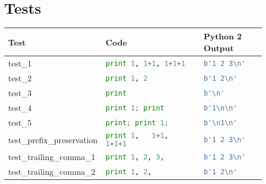 \section{Tests}
\begin{table*}[ht]
    \centering
    \begin{tabular}{@{}l|ll@{}}
    \toprule
    Test                                  & Code                                                  & Python 2 Output                        \\ \midrule
    test\_1                               & \lstinline[language=Python, style=pythonstyle]|print 1, 1+1, 1+1+1                                  | & \lstinline[language=Python, style=pythonstyle]|b'1 2 3\n'             | \\
    test\_2                               & \lstinline[language=Python, style=pythonstyle]|print 1, 2                                           | & \lstinline[language=Python, style=pythonstyle]|b'1 2\n'               | \\
    test\_3                               & \lstinline[language=Python, style=pythonstyle]|print                                                | & \lstinline[language=Python, style=pythonstyle]|b'\n'                  | \\
    test\_4                               & \lstinline[language=Python, style=pythonstyle]|print 1; print                                       | & \lstinline[language=Python, style=pythonstyle]|b'1\n\n'| \\
    test\_5                               & \lstinline[language=Python, style=pythonstyle]|print; print 1;                                      | & \lstinline[language=Python, style=pythonstyle]|b'\n1\n'| \\
    test\_prefix\_preservation            & \lstinline[language=Python, style=pythonstyle]|print 1,   1+1,   1+1+1                              | & \lstinline[language=Python, style=pythonstyle]|b'1 2 3\n'             | \\
    test\_trailing\_comma\_1              & \lstinline[language=Python, style=pythonstyle]|print 1, 2, 3,                                       | & \lstinline[language=Python, style=pythonstyle]|b'1 2 3\n'             | \\
    test\_trailing\_comma\_2              & \lstinline[language=Python, style=pythonstyle]|print 1, 2,                                          | & \lstinline[language=Python, style=pythonstyle]|b'1 2\n'               | \\

\end{tabular}
\end{table*}
